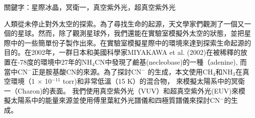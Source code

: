 \begin{abstractcn}

關鍵字：星際冰晶，冥衛一，真空紫外光，超真空紫外光
\vspace{2em}

人類從未停止對外太空的探索。為了尋找生命的起源，天文學家們觀測了一個又一個的星球。然而，除了觀測星球外，我們還能在實驗室模擬外太空的狀態，並把星際中的一些簡單份子製作出來。在實驗室模擬星際中的環境來達到探索生命起源的目的。在2002年，一群日本和美國科學家MIYAKAWA et al. (2002)\cite{miyakawa2002cold}在被稀釋的放置在-78度的環境中27年的NH$_4$CN中發現了鹼基(necleobase)的一種（adenine), 而當中CN$^-$正是胺基酸CN的來源。為了探討CN$^-$ 的生成，本文使用CH$_4$和NH$_3$在真空環境（1 $\times$ 10$^{-11}$ torr)和非常低溫（15 K）的混合物， 來模擬太陽系中的冥衛一（Charon)的表面。 我們使用真空紫外光（VUV）和超真空紫外光(EUV)來模擬太陽系中的能量來源並使用傅里葉紅外光譜儀和四極質譜儀來探討CN$^-$的生成。

\end{abstractcn} 
